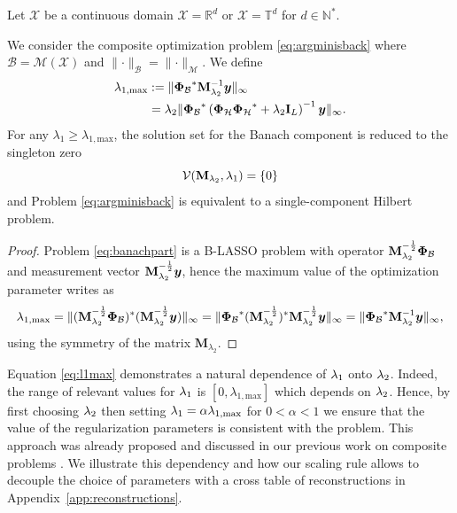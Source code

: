 \documentclass[12pt]{article}
\begin{document}
    \begin{proposition}
    \label{prop:lmax}
    Let $\mathcal{X}$ be a continuous domain $\mathcal{X}=\mathbb{R}^d$ or $\mathcal{X}=\mathbb{T}^d$ for $d \in \mathbb{N}^*$.

    We consider the composite optimization problem \eqref{eq:argminisback} where $\mathcal{B} = \mathcal{M}(\mathcal{X})$ and $\lVert \cdot \rVert_\mathcal{B} = \lVert \cdot \rVert_\mathcal{M}$. We define
    \begin{equation}
        \label{eq:l1max}
        \begin{split}
        \lambda_{1, \mathrm{max}} &:= \lVert {\bm{\Phi}_\mathcal{B}}^* \mathbf{M}_{\lambda_2}^{-1} \bm{y} \rVert_\infty \\
                & = \lambda_2 \lVert {\bm{\Phi}_\mathcal{B}}^* \left( {\bm{\Phi}_\mathcal{H}} {\bm{\Phi}_\mathcal{H}}^* + \lambda_2 \mathbf{I}_L \right)^{-1} \bm{y} \rVert_\infty.
        \end{split}
    \end{equation}
    For any $\lambda_1 \geq \lambda_{1, \mathrm{max}}$, the solution set for the Banach component is reduced to the singleton zero 
    $$\mathcal{V}(\mathbf{M}_{\lambda_{2}}, \lambda_{1}) = \left\{ 0 \right\}$$
    and Problem \eqref{eq:argminisback} is equivalent to a single-component Hilbert problem.
    \end{proposition}

    \begin{proof}
        Problem \eqref{eq:banachpart} is a B-LASSO problem with operator $\mathbf{M}_{\lambda_{2}}^{-\frac{1}{2}} {\bm{\Phi}_\mathcal{B}}$ and measurement vector $\mathbf{M}_{\lambda_{2}}^{-\frac{1}{2}}\bm{y}$, hence the maximum value of the optimization parameter writes as
        \begin{equation*}
            \lambda_{1, \mathrm{max}} = \lVert (\mathbf{M}_{\lambda_{2}}^{-\frac{1}{2}} {\bm{\Phi}_\mathcal{B}})^*  (\mathbf{M}_{\lambda_{2}}^{-\frac{1}{2}} \bm{y}) \rVert_\infty = \lVert {\bm{\Phi}_\mathcal{B}}^* (\mathbf{M}_{\lambda_{2}}^{-\frac{1}{2}})^* \mathbf{M}_{\lambda_{2}}^{-\frac{1}{2}} \bm{y} \rVert_\infty = \lVert {\bm{\Phi}_\mathcal{B}}^* \mathbf{M}_{\lambda_2}^{-1} \bm{y} \rVert_\infty,
        \end{equation*}
        using the symmetry of the matrix $\mathbf{M}_{\lambda_2}$.
    \end{proof}

    Equation \eqref{eq:l1max} demonstrates a natural dependence of $\lambda_{1}$ onto $\lambda_{2}$. Indeed, the range of relevant values for $\lambda_{1}$ is $[0, \lambda_{1, \mathrm{max}}]$ which depends on $\lambda_{2}$. Hence, by first choosing $\lambda_{2}$ then setting $\lambda_{1} = \alpha \lambda_{1, \mathrm{max}}$ for $0 < \alpha < 1$ we ensure that the value of the regularization parameters is consistent with the problem. This approach was already proposed and discussed in our previous work on composite problems \cite{jarret2024decoupled}. We illustrate this dependency and how our scaling rule allows to decouple the choice of parameters with a cross table of reconstructions in Appendix~\ref{app:reconstructions}.
\end{document}

